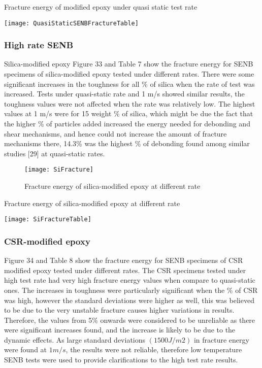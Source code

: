 \documentclass[numbers=noendperiod,chapterprefix=on]{icldt} %
\begin{document}
\begin{table}[!htpb]
\centering
\caption{Fracture energy of modified epoxy under quasi static test rate } %
\texttt{[image: QuasiStaticSENBFractureTable]}
\end{table}
\subsubsection{High rate SENB}
Silica-modified epoxy
\newline
Figure 33 and Table 7 show the fracture energy for SENB specimens of silica-modified epoxy tested under different rates. There were some significant increases in the toughness for all \% of silica when the rate of test was increased. Tests under quasi-static rate and 1 m/s showed similar results, the toughness values were not affected when the rate was relatively low. The highest values at 1 m/s were for 15 weight \% of silica, which might be due the fact that the higher \% of particles added increased the energy needed for debonding and shear mechanisms, and hence could not increase the amount of fracture mechanisms there, 14.3\% was the highest \% of debonding found among similar studies [29] at quasi-static rates.

\begin{figure}[!htpb]
\centering
\texttt{[image: SiFracture]}
\caption{Fracture energy of silica-modified epoxy at different rate} %
\end{figure}

\begin{table}[!htpb]
\centering
\caption{Fracture energy of silica-modified epoxy at different rate} %
\texttt{[image: SiFractureTable]}
\end{table}


\subsubsection{CSR-modified epoxy}
Figure 34 and Table 8 show the fracture energy for SENB specimens of CSR modified epoxy tested under different rates. The CSR specimens tested under high test rate had very high fracture energy values when compare to quasi-static ones. The increases in toughness were particularly significant when the \% of CSR was high, however the standard deviations were higher as well, this was believed to be due to the very unstable fracture causes higher variations in results. Therefore, the values from 5\% onwards were considered to be unreliable as there were significant increases found, and the increase is likely to be due to the dynamic effects. 
As large standard deviations $(1500 J/m2)$ in fracture energy were found at $1 m/s$, the results were not reliable, therefore low temperature SENB tests were used to provide clarifications to the high test rate results.
\end{document}
